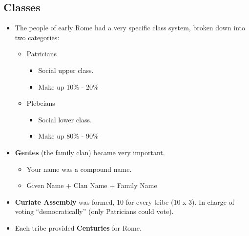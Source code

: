\documentclass[12pt, twoside]{article}
\begin{document}
\subsection{Classes}
\begin{itemize}
\item The people of early Rome had a very specific class system, broken down into two categories:
	\begin{itemize}
	\item Patricians
		\begin{itemize}
		\item Social upper class.
		\item Make up 10\% - 20\%
		\end{itemize}
	\item Plebeians
		\begin{itemize}
		\item Social lower class.
		\item Make up 80\% - 90\%
		\end{itemize}
	\end{itemize}
\item \textbf{Gentes} (the family clan) became very important.
	\begin{itemize}
	\item Your name was a compound name.
	\item Given Name + Clan Name + Family Name
	\end{itemize}
\item \textbf{Curiate Assembly} was formed, 10 for every tribe (10 x 3).  In charge of voting ``democratically'' (only Patricians could vote).
\item Each tribe provided \textbf{Centuries} for Rome.
\end{itemize}
\end{document}
